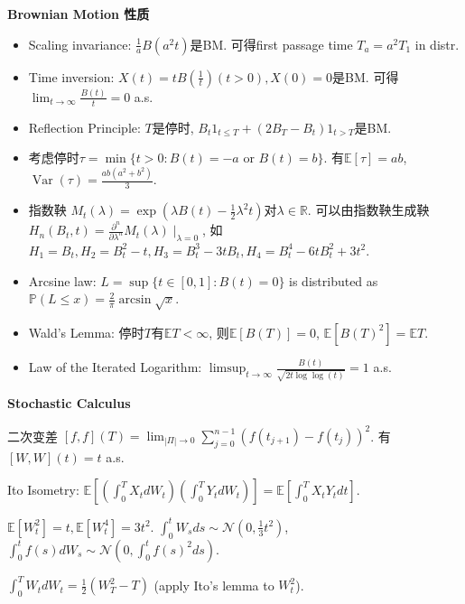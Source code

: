 \documentclass[UTF8]{ctexart}
\begin{document}
\noindent \textbf{Brownian Motion 性质} \par
\begin{itemize}
\item Scaling invariance: $\frac{1}{a} B(a^2t)$是BM. 可得first passage time $T_a=a^2 T_1$ in distr.

\item Time inversion: $X(t)=tB(\frac{1}{t})(t>0),X(0)=0$是BM. 可得 $\lim_{t\to\infty}\frac{B(t)}{t}=0$ a.s.

\item Reflection Principle: $T$是停时, $B_t1_{t\leq T}+(2B_T-B_t)1_{t>T}$是BM.

\item 考虑停时$\tau = \min\{t>0: B(t)=-a \text{ or } B(t)=b\}$. 有$\mathbb{E}[\tau]=ab$, 
	$\operatorname{Var}(\tau)=\frac{ab(a^2+b^2)}{3}$.

\item 指数鞅 $M_t(\lambda)=\exp(\lambda B(t)-\frac12 \lambda^2 t)$对$\lambda\in\mathbb{R}$. 
	可以由指数鞅生成鞅 $H_n(B_t,t)=\frac{\partial^n}{\partial\lambda^n}M_t(\lambda)\mid_{\lambda=0}$,
	如$H_1=B_t, H_2=B_t^2-t, H_3=B_t^3-3tB_t, H_4=B_t^4-6tB_t^2+3t^2$.

\item Arcsine law: $L=\sup \{t\in[0,1]:B(t)=0\}$ is distributed as $\mathbb{P}(L\leq x)=\frac{2}{\pi}\arcsin\sqrt{x}$.

\item Wald's Lemma: 停时$T$有$\mathbb{E}T <\infty$, 则$\mathbb{E}[B(T)]=0$, $\mathbb{E}[B(T)^2]=\mathbb{E}T$.

\item Law of the Iterated Logarithm: $\limsup _{t \rightarrow \infty} \frac{B(t)}{\sqrt{2 t \log \log (t)}}=1$ a.s.

\end{itemize}

\noindent \textbf{Stochastic Calculus}

二次变差 $[f,f](T)=\lim_{|\Pi|\to 0} \sum_{j=0}^{n-1}(f(t_{j+1})-f(t_j))^2$. 有 $[W,W](t)=t$ a.s.

Ito Isometry: $\mathbb{E}\left[ (\int_0^T X_t dW_t)(\int_0^T Y_t dW_t) \right]
	=\mathbb{E}\left[ \int_0^T X_t Y_t dt \right]$.

$\mathbb{E}[W_t^2]=t, \mathbb{E}[W_t^4]=3t^2$.
$\int_0^t W_s ds \sim \mathcal{N}(0,\frac13 t^2)$,
$\int_0^t f(s) dW_s \sim \mathcal{N}\left(0,\int_0^t f(s)^2 ds\right)$.

$\int_0^T W_tdW_t = \frac12 (W_T^2-T)$ (apply Ito's lemma to $W_t^2$).
\end{document}
